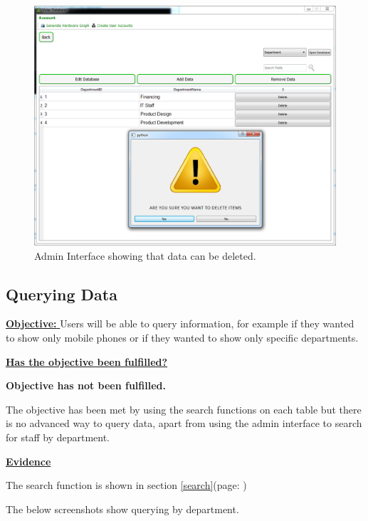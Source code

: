 \begin{figure}[H]
    \includegraphics[width=\textwidth]{./Evaluation/Images/admin3.png}
    \caption{Admin Interface showing that data can be deleted.} 
\end{figure}



\subsection{Querying Data}

\underline{\textbf{Objective:} }  Users will be able to query information, for example if they wanted to show only mobile phones or if they wanted to show only specific departments.

\underline{\textbf{Has the objective been fulfilled?}}

\textbf{Objective has not been fulfilled.}

The objective has been met by using the search functions on each table but there is no advanced way to query data, apart from using the admin interface to search for staff by department. 

\underline{\textbf{Evidence}}

The search function is shown in section \ref{search}(page: \pageref{search})

The below screenshots show querying by department.

